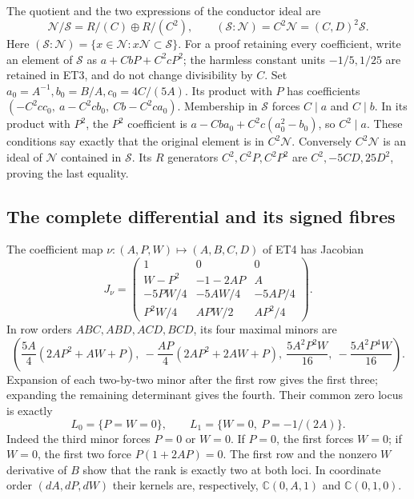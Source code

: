 The quotient and the two expressions of the conductor ideal are
\[
 \mathscr N/\mathscr S=R/(C)\oplus R/(C^2),\qquad
 (\mathscr S:\mathscr N)=C^2\mathscr N=(C,D)^2\mathscr S .
 \tag{ET5}
\]
Here $(\mathscr S:\mathscr N)=\{x\in\mathscr N:x\mathscr N\subset\mathscr S\}$.
For a proof retaining every coefficient, write an element of $\mathscr S$
as $a+CbP+C^2cP^2$; the harmless constant units $-1/5,1/25$
are retained in ET3, and do not change divisibility by $C$.
Set $a_0=A^{-1},b_0=B/A,c_0=4C/(5A)$.
Its product with $P$ has coefficients
$(-C^2cc_0,\ a-C^2cb_0,\ Cb-C^2ca_0)$.
Membership in $\mathscr S$ forces $C\mid a$ and $C\mid b$.
In its product with $P^2$, the $P^2$ coefficient is
$a-Cba_0+C^2c(a_0^2-b_0)$, so $C^2\mid a$.
These conditions say exactly that the original element is in $C^2\mathscr N$.
Conversely $C^2\mathscr N$ is an ideal of $\mathscr N$ contained in
$\mathscr S$. Its $R$ generators $C^2,C^2P,C^2P^2$ are
$C^2,-5CD,25D^2$, proving the last equality.

\subsection{The complete differential and its signed fibres}
The coefficient map $\nu:(A,P,W)\mapsto(A,B,C,D)$ of ET4 has Jacobian
\[
 J_\nu=\begin{pmatrix}
 1&0&0\\
 W-P^2&-1-2AP&A\\
 -5PW/4&-5AW/4&-5AP/4\\
 P^2W/4&APW/2&AP^2/4
 \end{pmatrix}.
 \tag{ET6}
\]
In row orders $ABC,ABD,ACD,BCD$, its four maximal minors are
\[
 \left(
 \frac{5A}{4}(2AP^2+AW+P),\
 -\frac{AP}{4}(2AP^2+2AW+P),\
 \frac{5A^2P^2W}{16},\
 -\frac{5A^2P^4W}{16}
 \right).
 \tag{ET7}
\]
Expansion of each two-by-two minor after the first row gives the first
three; expanding the remaining determinant gives the fourth.
Their common zero locus is exactly
\[
 L_0=\{P=W=0\},\qquad
 L_1=\{W=0,\ P=-1/(2A)\}.
 \tag{ET8}
\]
Indeed the third minor forces $P=0$ or $W=0$.
If $P=0$, the first forces $W=0$; if $W=0$, the first two force
$P(1+2AP)=0$. The first row and the nonzero $W$ derivative of $B$
show that the rank is exactly two at both loci.
In coordinate order $(dA,dP,dW)$ their kernels are, respectively,
$\mathbb C(0,A,1)$ and $\mathbb C(0,1,0)$.

